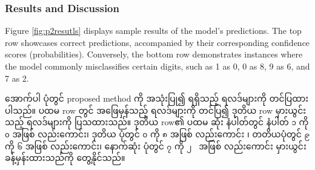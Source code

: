 \newpage
\subsubsection{Results and Discussion}

Figure \ref{fig:p2resutls} displays sample results of the model's predictions. The top row showcases correct predictions, accompanied by their corresponding confidence scores (probabilities). Conversely, the bottom row demonstrates instances where the model commonly misclassifies certain digits, such as 1 as 0, 0 as 8, 9 as 6, and 7 as 2.

အောက်ပါ ပုံတွင် proposed method ကို အသုံးပြု၍ ရရှိသည့် ရလဒ်များကို တင်ပြထားပါသည်။ ပထမ row တွင် အဖြေမှန်သည့် ရလဒ်များကို တင်ပြ၍ ဒုတိယ row မှားယွင်းသည့် ရလဒ်များကို ပြသထားသည်။ ဒုတိယ row၏ ပထမ ဆုံး နံပါတ်တွင် နံပါတ် \texttt{၁} ကို \texttt{၀} အဖြစ် လည်းကောင်း၊ ဒုတိယ ပုံတွင် \texttt{၀} ကို \texttt{၈} အဖြစ် လည်းကောင်း ၊ တတိယပုံတွင် \texttt{၉} ကို \texttt{၆} အဖြစ် လည်းကောင်း၊ နောက်ဆုံး ပုံတွင် \texttt{၇} ကို \texttt{၂ } အဖြစ် လည်းကောင်း မှားယွင်း ခန့်မှန်းထားသည်ကို တွေ့နိုင်သည်။ 

